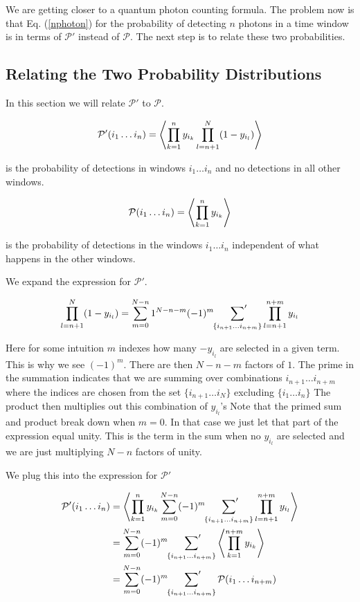 \documentclass[12pt]{article}
\begin{document}
We are getting closer to a quantum photon counting formula. The problem now is that Eq. (\ref{nphoton}) for the probability of detecting $n$ photons in a time window is in terms of $\mathcal{P}'$ instead of $\mathcal{P}$. The next step is to relate these two probabilities.

\subsection{Relating the Two Probability Distributions}

In this section we will relate $\mathcal{P}'$ to $\mathcal{P}$.

\begin{align}
\mathcal{P}'(i_1 \ldots i_n) = \Braket{\prod_{k=1}^n y_{i_k} \prod_{l=n+1}^{N} (1-y_{i_l})}
\end{align}

is the probability of detections in windows $i_1 \ldots i_n$ and no detections in all other windows.

\begin{align}
\mathcal{P}(i_1 \ldots i_n) = \Braket{\prod_{k=1}^n y_{i_k}}
\end{align}

is the probability of detections in the windows $i_1 \ldots i_n$ independent of what happens in the other windows. 

We expand the expression for $\mathcal{P}'$.

\begin{align}
\prod_{l=n+1}^N (1-y_{i_l}) = \sum_{m=0}^{N-n} 1^{N-n-m} (-1)^{m} \sideset{}{'}\sum_{\{i_{n+1} \ldots i_{n+m}\}} \prod_{l=n+1}^{n+m} y_{i_l}
\end{align}

Here for some intuition $m$ indexes how many $-y_{i_l}$ are selected in a given term. This is why we see $(-1)^m$. There are then $N-n-m$ factors of $1$. The prime in the summation indicates that we are summing over combinations $i_{n+1} \ldots i_{n+m}$ where the indices are chosen from the set $\{i_{n+1} \ldots i_N\}$ excluding $\{ i_1 \ldots i_n\}$ The product then multiplies out this combination of $y_{i_l}$'s Note that the primed sum and product break down when $m=0$. In that case we just let that part of the expression equal unity. This is the term in the sum when no $y_{i_l}$ are selected and we are just multiplying $N-n$ factors of unity.

We plug this into the expression for $\mathcal{P}'$

\begin{align}
\mathcal{P}'(i_1 \ldots i_n) &= \Braket{\prod_{k=1}^n y_{i_k} \sum_{m=0}^{N-n} (-1)^{m} \sideset{}{'}\sum_{\{i_{n+1} \ldots i_{n+m}\}} \prod_{l=n+1}^{n+m} y_{i_l}}\\
&= \sum_{m=0}^{N-n} (-1)^m \sideset{}{'}\sum_{\{i_{n+1} \ldots i_{n+m}\}} \Braket{\prod_{k=1}^{n+m} y_{i_k}}\\
&= \sum_{m=0}^{N-n} (-1)^m \sideset{}{'}\sum_{\{i_{n+1} \ldots i_{n+m}\}} \mathcal{P}(i_1 \ldots i_{n+m})
\end{align}
\end{document}
